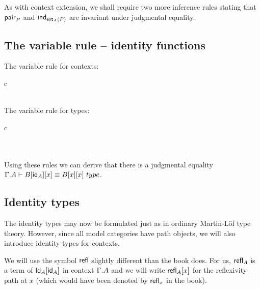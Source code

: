 As with context extension, we shall require two more inference rules stating that
$\mathsf{pair}_P$ and $\mathsf{ind}_{\mathsf{ext}_A(P)}$ are invariant under judgmental equality.

\subsection{The variable rule -- identity functions}
The variable rule for contexts:
\begin{infarray}{c}
\inference{\jctx{\Gamma}}{\jterm{\Gamma}{\ctxwk{\Gamma}{\Gamma}}{\idfunc[\Gamma]}}\\
\\
\end{infarray}


The variable rule for types:
\begin{infarray}{c}
\\
\\
\\
\end{infarray}

Using these rules we can derive that there is a judgmental equality $\jtypeeq{\ctxext{\Gamma}{A}}{\subst{x}{{\idfunc[A]}{B}}}
{\subst{x}{{x}{B}}}$.

\subsection{Identity types}
The identity types may now be formulated just as in ordinary Martin\nobreakdash-L\"of
type theory. However, since all model categories have path objects, we will also
introduce identity types for contexts.

We will use the symbol ${\mathsf{refl}}$ slightly different than the book does. For us,
$\mathsf{refl}_{A}$ is a term of $\subst{\idfunc[A]}{\idtypevar{A}}$ in context
$\ctxext{\Gamma}{A}$ and we will write $\subst{x}{\refl{A}}$ for the reflexivity
path at $x$ (which would have been denoted by $\mathsf{refl}_{x}$ in the book).

